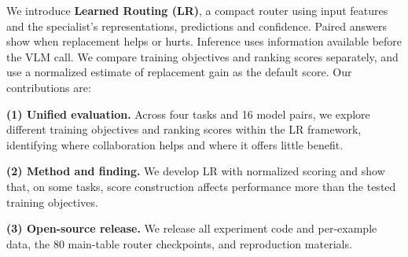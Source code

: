 We introduce \textbf{Learned Routing (LR)}, a compact router using input features and the specialist's representations, predictions and confidence. Paired answers show when replacement helps or hurts. Inference uses information available before the VLM call. We compare training objectives and ranking scores separately, and use a normalized estimate of replacement gain as the default score. Our contributions are:

\noindent\textbf{(1) Unified evaluation.} Across four tasks and 16 model pairs, we explore different training objectives and ranking scores within the LR framework, identifying where collaboration helps and where it offers little benefit.

\noindent\textbf{(2) Method and finding.} We develop LR with normalized scoring and show that, on some tasks, score construction affects performance more than the tested training objectives.

\noindent\textbf{(3) Open-source release.} We release all experiment code and per-example data, the 80 main-table router checkpoints, and reproduction materials.
